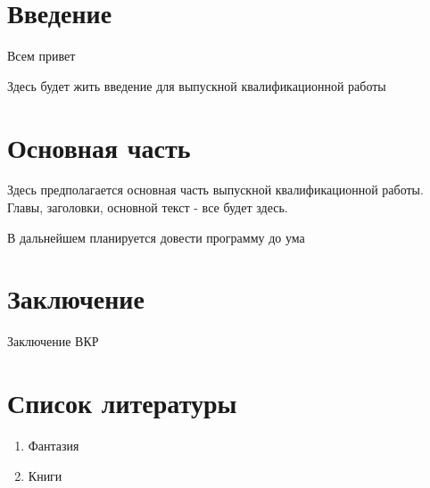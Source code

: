 \documentclass[a4paper,14pt]{article}
\begin{document}
        \newpage
        \tableofcontents

        \newpage
        \section*{Введение}
        Всем привет

Здесь будет жить введение для выпускной квалификационной работы

        \newpage
        \section{Основная часть}
        Здесь предполагается основная часть выпускной квалификационной работы. Главы, заголовки, основной текст - все будет здесь.

В дальнейшем планируется довести программу до ума

        \newpage
        \section*{Заключение}
        Заключение ВКР

        \newpage
        \section*{Список литературы}
        \begin{enumerate}
            \item Фантазия
\item Книги
        \end{enumerate}

        
\end{document}
